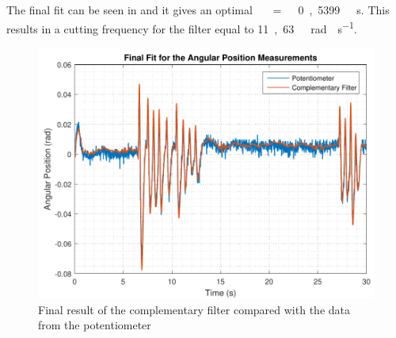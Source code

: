 The final fit can be seen in  and it gives an optimal \si{\tau\ =\ 0,5399\ s}. This results in a cutting frequency for the filter equal to \si{11,63\ rad \cdot s^{-1}}.
%
\begin{figure}[H]
	\centering
	\includegraphics[scale=0.65]{figures/filterSensTool}
	\caption{Final result of the complementary filter compared with the data from the potentiometer}
	\label{filterSensTool}
\end{figure}\vspace{-5mm}
%